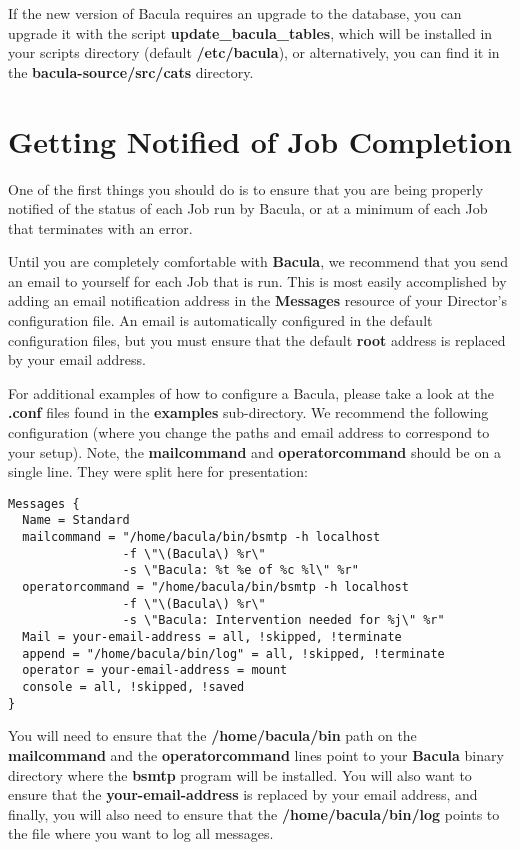 If the new version of Bacula requires an upgrade to the database,
you can upgrade it with the script {\bf update\_bacula\_tables}, which
will be installed in your scripts directory (default {\bf /etc/bacula}),
or alternatively, you can find it in the  
{\bf \lt{}bacula-source\gt{}/src/cats} directory.

\section{Getting Notified of Job Completion}
\label{notification}

One of the first things you should do is to ensure that you are being properly
notified of the status of each Job run by Bacula, or at a minimum of each Job
that terminates with an error. 

Until you are completely comfortable with {\bf Bacula}, we recommend that you
send an email to yourself for each Job that is run. This is most easily
accomplished by adding an email notification address in the {\bf Messages}
resource of your Director's configuration file. An email is automatically
configured in the default configuration files, but you must ensure that the
default {\bf root} address is replaced by your email address. 

For additional examples of how to configure a Bacula, please take a look at the
{\bf .conf} files found in the {\bf examples} sub-directory. We recommend the
following configuration (where you change the paths and email address to
correspond to your setup). Note, the {\bf mailcommand} and {\bf
operatorcommand} should be on a single line. They were split here for
presentation: 

\footnotesize
\begin{verbatim}
Messages {
  Name = Standard
  mailcommand = "/home/bacula/bin/bsmtp -h localhost
                -f \"\(Bacula\) %r\"
                -s \"Bacula: %t %e of %c %l\" %r"
  operatorcommand = "/home/bacula/bin/bsmtp -h localhost
                -f \"\(Bacula\) %r\"
                -s \"Bacula: Intervention needed for %j\" %r"
  Mail = your-email-address = all, !skipped, !terminate
  append = "/home/bacula/bin/log" = all, !skipped, !terminate
  operator = your-email-address = mount
  console = all, !skipped, !saved
}
\end{verbatim}
\normalsize

You will need to ensure that the {\bf /home/bacula/bin} path on the {\bf
mailcommand} and the {\bf operatorcommand} lines point to your {\bf Bacula}
binary directory where the {\bf bsmtp} program will be installed. You will
also want to ensure that the {\bf your-email-address} is replaced by your
email address, and finally, you will also need to ensure that the {\bf
/home/bacula/bin/log} points to the file where you want to log all messages. 

